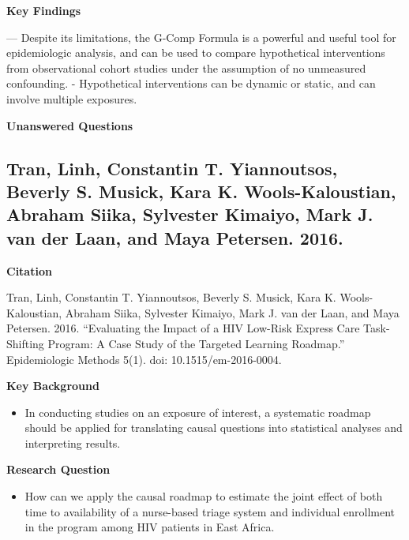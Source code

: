 \documentclass[
]{book}
\providecommand{\tightlist}{%
  \setlength{\itemsep}{0pt}\setlength{\parskip}{0pt}}
\begin{document}
\textbf{Key Findings}

--- Despite its limitations, the G-Comp Formula is a powerful and useful tool for epidemiologic analysis, and can be used to compare hypothetical interventions from observational cohort studies under the assumption of no unmeasured confounding.
- Hypothetical interventions can be dynamic or static, and can involve multiple exposures.

\textbf{Unanswered Questions}

\hypertarget{tran-linh-constantin-t.-yiannoutsos-beverly-s.-musick-kara-k.-wools-kaloustian-abraham-siika-sylvester-kimaiyo-mark-j.-van-der-laan-and-maya-petersen.-2016.}{%
\subsection{Tran, Linh, Constantin T. Yiannoutsos, Beverly S. Musick, Kara K. Wools-Kaloustian, Abraham Siika, Sylvester Kimaiyo, Mark J. van der Laan, and Maya Petersen. 2016.}\label{tran-linh-constantin-t.-yiannoutsos-beverly-s.-musick-kara-k.-wools-kaloustian-abraham-siika-sylvester-kimaiyo-mark-j.-van-der-laan-and-maya-petersen.-2016.}}

\textbf{Citation}

Tran, Linh, Constantin T. Yiannoutsos, Beverly S. Musick, Kara K. Wools-Kaloustian, Abraham Siika, Sylvester Kimaiyo, Mark J. van der Laan, and Maya Petersen. 2016. ``Evaluating the Impact of a HIV Low-Risk Express Care Task-Shifting Program: A Case Study of the Targeted Learning Roadmap.'' Epidemiologic Methods 5(1). doi: 10.1515/em-2016-0004.

\textbf{Key Background}

\begin{itemize}
\tightlist
\item
  In conducting studies on an exposure of interest, a systematic roadmap should be applied for translating causal questions into statistical analyses and interpreting results.
\end{itemize}

\textbf{Research Question}

\begin{itemize}
\tightlist
\item
  How can we apply the causal roadmap to estimate the joint effect of both time to availability of a nurse-based triage system and individual enrollment in the program among HIV patients in East Africa.
\end{itemize}
\end{document}
